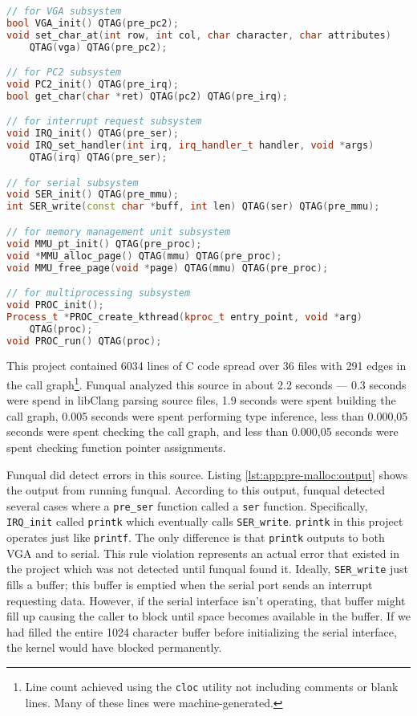 \noindent\begin{minipage}[t]{\linewidth}
\begin{lstlisting}[language=c++,caption={Lines inserted into C source for a simple kernel in order to prevent subsystems from depending on interfaces not yet initialized.},label={lst:app:pre-malloc:annote}]
// for VGA subsystem
bool VGA_init() QTAG(pre_pc2);
void set_char_at(int row, int col, char character, char attributes)
    QTAG(vga) QTAG(pre_pc2);

// for PC2 subsystem
void PC2_init() QTAG(pre_irq);
bool get_char(char *ret) QTAG(pc2) QTAG(pre_irq);

// for interrupt request subsystem
void IRQ_init() QTAG(pre_ser);
void IRQ_set_handler(int irq, irq_handler_t handler, void *args)
    QTAG(irq) QTAG(pre_ser);

// for serial subsystem
void SER_init() QTAG(pre_mmu);
int SER_write(const char *buff, int len) QTAG(ser) QTAG(pre_mmu);

// for memory management unit subsystem
void MMU_pt_init() QTAG(pre_proc);
void *MMU_alloc_page() QTAG(mmu) QTAG(pre_proc);
void MMU_free_page(void *page) QTAG(mmu) QTAG(pre_proc);

// for multiprocessing subsystem
void PROC_init();
Process_t *PROC_create_kthread(kproc_t entry_point, void *arg)
    QTAG(proc);
void PROC_run() QTAG(proc);
\end{lstlisting}
\end{minipage}

\pagebreak

This project contained 6034 lines of C code spread over 36 files with 291 edges in the call graph\footnote{Line count achieved using the \lstinline{cloc} utility not including comments or blank lines.  Many of these lines were machine-generated.}.  Funqual analyzed this source in about 2.2 seconds --- 0.3 seconds were spend in libClang parsing source files, 1.9 seconds were spent building the call graph, 0.005 seconds were spent performing type inference, less than 0.000,05 seconds were spent checking the call graph, and less than 0.000,05 seconds were spent checking function pointer assignments.  

Funqual did detect errors in this source.  Listing \ref{lst:app:pre-malloc:output} shows the output from running funqual.  According to this output, funqual detected several cases where a \lstinline{pre_ser} function called a \lstinline{ser} function.  Specifically, \lstinline{IRQ_init} called \lstinline{printk} which eventually calls \lstinline{SER_write}.  \lstinline{printk} in this project operates just like \lstinline{printf}.  The only difference is that \lstinline{printk} outputs to both VGA and to serial.  This rule violation represents an actual error that existed in the project which was not detected until funqual found it.  Ideally, \lstinline{SER_write} just fills a buffer; this buffer is emptied when the serial port sends an interrupt requesting data.  However, if the serial interface isn't operating, that buffer might fill up causing the caller to block until space becomes available in the buffer.  If we had filled the entire 1024 character buffer before initializing the serial interface, the kernel would have blocked permanently.

